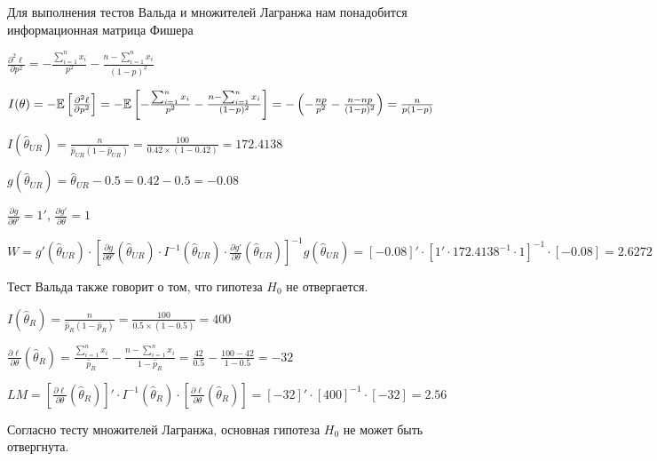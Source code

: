 \begin{problem}
\begin{sol}
Для выполнения тестов Вальда и множителей Лагранжа нам понадобится информационная матрица Фишера

$\frac{\partial^2 \ell}{\partial p^2} = - \frac{\sum_{i=1}^n x_i}{p^2} - \frac{n - \sum_{i=1}^n x_i}{(1 - p)^2}$

$I(\theta) = -\mathbb{E}\left[ \frac{\partial^2 \ell}{\partial p^2} \right] = -\mathbb{E} \left[ - \frac{\sum_{i=1}^n x_i}{p^2} - \frac{n - \sum_{i=1}^n x_i}{(1 - p)^2} \right] = -\left(-\frac{np}{p^2} - \frac{n - np}{(1-p)^2}\right) = \frac{n}{p(1-p)}$

$I(\hat{\theta}_{UR}) = \frac{n}{\hat{p}_{UR}(1-\hat{p}_{UR})} = \frac{100}{0.42 \times (1 - 0.42)} = 172.4138$

$g(\hat{\theta}_{UR}) = \hat{\theta}_{UR} - 0.5 = 0.42 - 0.5 = -0.08$

$\frac{\partial g}{\partial \theta'} = 1'$, $\frac{\partial g'}{\partial \theta} = 1$

$W = g'(\hat{\theta}_{UR}) \cdot \left[ \frac{\partial g}{\partial \theta'}(\hat{\theta}_{UR}) \cdot I^{-1}(\hat{\theta}_{UR}) \cdot \frac{\partial g'}{\partial \theta}(\hat{\theta}_{UR}) \right]^{-1} g(\hat{\theta}_{UR}) = [-0.08]' \cdot [1' \cdot 172.4138^{-1} \cdot 1]^{-1} \cdot [-0.08] = 2.6272$

Тест Вальда также говорит о том, что гипотеза $H_0$ не отвергается.

$I(\hat{\theta}_{R}) = \frac{n}{\hat{p}_{R}(1-\hat{p}_{R})} = \frac{100}{0.5 \times (1 - 0.5)} = 400$

$\frac{\partial \ell}{\partial \theta}(\hat{\theta}_R) = \frac{\sum_{i=1}^n x_i}{\hat{p}_R} - \frac{n - \sum_{i=1}^n x_i}{1 - \hat{p}_R} = \frac{42}{0.5} - \frac{100 - 42}{1 - 0.5} = -32$

$LM = \left[ \frac{\partial \ell}{\partial \theta}(\hat{\theta}_{R}) \right]' \cdot I^{-1}(\hat{\theta}_{R}) \cdot \left[ \frac{\partial \ell}{\partial \theta}(\hat{\theta}_{R}) \right] = [-32]' \cdot [400]^{-1} \cdot [-32] = 2.56$

Согласно тесту множителей Лагранжа, основная гипотеза $H_0$ не может быть отвергнута.
\end{sol}
\end{problem}



